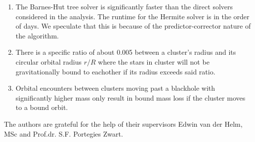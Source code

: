 \documentclass{aa}
\begin{document}
   \begin{enumerate}
      \item The Barnes-Hut tree solver is significantly faster than the direct solvers considered in the analysis. The runtime for the Hermite solver is in the order of days. We speculate that this is because of the predictor-corrector nature of the algorithm.
      \item There is a specific ratio of about 0.005 between a cluster's radius and its circular orbital radius $r/R$ where the stars in cluster will not be gravitationally bound to eachother if its radius exceeds said ratio.
      \item Orbital encounters between clusters moving past a blackhole with significantly higher mass only result in bound mass loss if the cluster moves to a bound orbit.
   \end{enumerate}

\begin{acknowledgements}
      The authors are grateful for the help of their supervisors
      Edwin van der Helm, MSc and Prof.dr. S.F. Portegies Zwart.
\end{acknowledgements}



 
 
\end{document}
